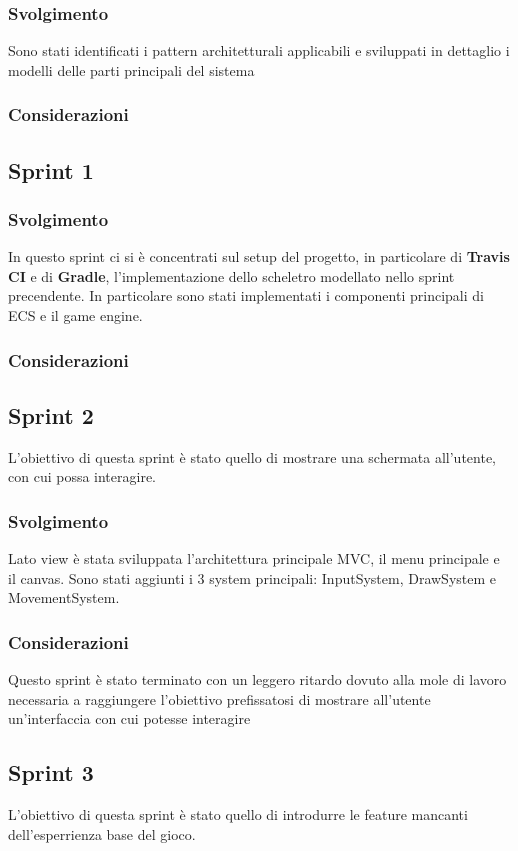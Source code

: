 \subsubsection{Svolgimento}
Sono stati identificati i pattern architetturali applicabili e sviluppati in dettaglio i modelli delle parti principali del sistema
\subsubsection{Considerazioni}

\subsection{Sprint 1}
\subsubsection{Svolgimento}
In questo sprint ci si è concentrati sul setup del progetto, in particolare di \textbf{Travis CI} e di \textbf{Gradle}, l'implementazione dello scheletro modellato nello sprint precendente.
In particolare sono stati implementati i componenti principali di ECS e il game engine.
\subsubsection{Considerazioni}
\subsection{Sprint 2}
L'obiettivo di questa sprint è stato quello di mostrare una schermata all'utente, con cui possa interagire.
\subsubsection{Svolgimento}
Lato view è stata sviluppata l'architettura principale MVC, il menu principale e il canvas.
Sono stati aggiunti i 3 system principali: InputSystem, DrawSystem e MovementSystem.
\subsubsection{Considerazioni}
Questo sprint è stato terminato con un leggero ritardo dovuto alla mole di lavoro necessaria a raggiungere l'obiettivo prefissatosi di mostrare all'utente un'interfaccia con cui potesse interagire
\subsection{Sprint 3}
L'obiettivo di questa sprint è stato quello di introdurre le feature mancanti dell'esperrienza base del gioco.

